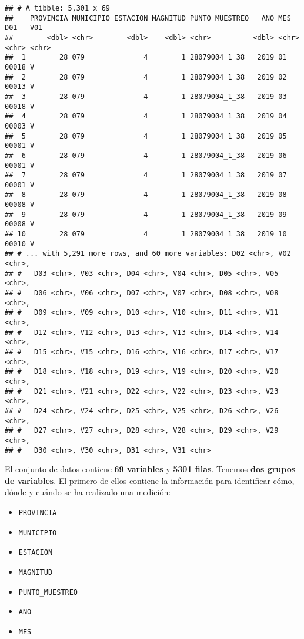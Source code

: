 \documentclass[]{article}
\providecommand{\tightlist}{%
  \setlength{\itemsep}{0pt}\setlength{\parskip}{0pt}}
\begin{document}
\begin{verbatim}
## # A tibble: 5,301 x 69
##    PROVINCIA MUNICIPIO ESTACION MAGNITUD PUNTO_MUESTREO   ANO MES   D01   V01  
##        <dbl> <chr>        <dbl>    <dbl> <chr>          <dbl> <chr> <chr> <chr>
##  1        28 079              4        1 28079004_1_38   2019 01    00018 V    
##  2        28 079              4        1 28079004_1_38   2019 02    00013 V    
##  3        28 079              4        1 28079004_1_38   2019 03    00018 V    
##  4        28 079              4        1 28079004_1_38   2019 04    00003 V    
##  5        28 079              4        1 28079004_1_38   2019 05    00001 V    
##  6        28 079              4        1 28079004_1_38   2019 06    00001 V    
##  7        28 079              4        1 28079004_1_38   2019 07    00001 V    
##  8        28 079              4        1 28079004_1_38   2019 08    00008 V    
##  9        28 079              4        1 28079004_1_38   2019 09    00008 V    
## 10        28 079              4        1 28079004_1_38   2019 10    00010 V    
## # ... with 5,291 more rows, and 60 more variables: D02 <chr>, V02 <chr>,
## #   D03 <chr>, V03 <chr>, D04 <chr>, V04 <chr>, D05 <chr>, V05 <chr>,
## #   D06 <chr>, V06 <chr>, D07 <chr>, V07 <chr>, D08 <chr>, V08 <chr>,
## #   D09 <chr>, V09 <chr>, D10 <chr>, V10 <chr>, D11 <chr>, V11 <chr>,
## #   D12 <chr>, V12 <chr>, D13 <chr>, V13 <chr>, D14 <chr>, V14 <chr>,
## #   D15 <chr>, V15 <chr>, D16 <chr>, V16 <chr>, D17 <chr>, V17 <chr>,
## #   D18 <chr>, V18 <chr>, D19 <chr>, V19 <chr>, D20 <chr>, V20 <chr>,
## #   D21 <chr>, V21 <chr>, D22 <chr>, V22 <chr>, D23 <chr>, V23 <chr>,
## #   D24 <chr>, V24 <chr>, D25 <chr>, V25 <chr>, D26 <chr>, V26 <chr>,
## #   D27 <chr>, V27 <chr>, D28 <chr>, V28 <chr>, D29 <chr>, V29 <chr>,
## #   D30 <chr>, V30 <chr>, D31 <chr>, V31 <chr>
\end{verbatim}

El conjunto de datos contiene \textbf{69 variables} y \textbf{5301
filas}. Tenemos \textbf{dos grupos de variables}. El primero de ellos
contiene la información para identificar cómo, dónde y cuándo se ha
realizado una medición:

\begin{itemize}
\tightlist
\item
  \texttt{PROVINCIA}
\item
  \texttt{MUNICIPIO}
\item
  \texttt{ESTACION}
\item
  \texttt{MAGNITUD}
\item
  \texttt{PUNTO\_MUESTREO}
\item
  \texttt{ANO}
\item
  \texttt{MES}
\end{itemize}
\end{document}
